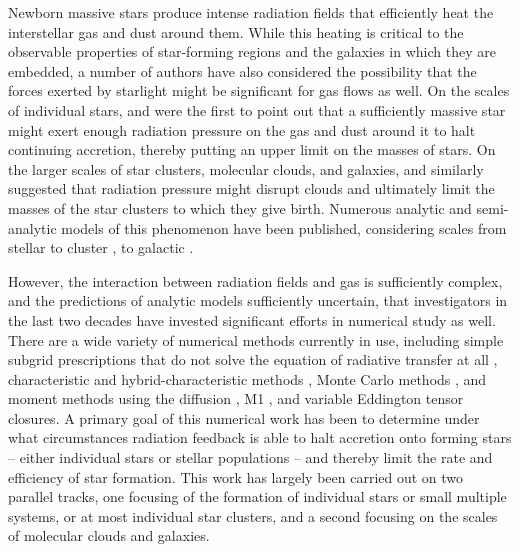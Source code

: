 \documentclass[useAMS,usenatbib]{mn2e}
\begin{document}
Newborn massive stars produce intense radiation fields that efficiently heat the interstellar gas and dust around them. While this heating is critical to the observable properties of star-forming regions and the galaxies in which they are embedded, a number of authors have also considered the possibility that the forces exerted by starlight might be significant for gas flows as well. On the scales of individual stars, \citet{larson71a} and \citet{kahn74a} were the first to point out that a sufficiently massive star might exert enough radiation pressure on the gas and dust around it to halt continuing accretion, thereby putting an upper limit on the masses of stars. On the larger scales of star clusters, molecular clouds, and galaxies, \citet{odell67a} and \citet{scoville01a} similarly suggested that radiation pressure might disrupt clouds and ultimately limit the masses of the star clusters to which they give birth. Numerous analytic and semi-analytic models of this phenomenon have been published, considering scales from stellar \citep[e.g.,][]{wolfire86a, wolfire87a, nakano89a, jijina96a} to cluster \citep[e.g.,][]{krumholz09d, fall10a, murray10a, thompson16a, reissl18a}, to galactic \citep[e.g.,][]{murray05a, thompson05a, murray11a, zhang12a, crocker18a}.

However, the interaction between radiation fields and gas is sufficiently complex, and the predictions of analytic models sufficiently uncertain, that investigators in the last two decades have invested significant efforts in numerical study as well. There are a wide variety of numerical methods currently in use, including simple subgrid prescriptions that do not solve the equation of radiative transfer at all \citep{hopkins11a, hopkins18b}, characteristic and hybrid-characteristic methods \citep{kuiper10a, rosen17a}, Monte Carlo methods \citep[e.g.,][]{tsang15a}, and moment methods using the diffusion \citep[e.g.,][]{krumholz07b}, M1 \citep[e.g.,][]{skinner13a, rosdahl15b, kannan18a}, and variable Eddington tensor \citep{davis12a, jiang12a} closures.  A primary goal of this numerical work has been to determine under what circumstances radiation feedback is able to halt accretion onto forming stars -- either individual stars or stellar populations -- and thereby limit the rate and efficiency of star formation. This work has largely been carried out on two parallel tracks, one focusing of the formation of individual stars or small multiple systems, or at most individual star clusters, and a second focusing on the scales of molecular clouds and galaxies. 
\end{document}
